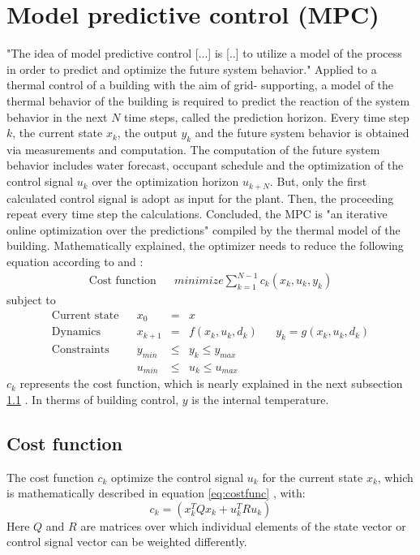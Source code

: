 \section{Model predictive control (MPC)}
\label{section:mpc}
"The idea of model predictive control [...] is [..] to utilize a model of the process in order to predict and optimize the future system behavior."
\cite{Grune.2017}
Applied to a thermal control of a building with the aim of grid- supporting, a model of the thermal behavior of the building is required to predict the reaction of the system behavior in the next $N$ time steps, called the prediction horizon. Every time step $k$, the current state \textbf{$x_k$}, the output \textbf{$y_k$} and the future system behavior is obtained via measurements and computation. The computation of the future system behavior includes water forecast, occupant schedule  and the optimization of the control signal \textbf{$u_k$} over the optimization horizon \textbf{$u_{k+N}$}. But, only the first calculated control signal is adopt as input for the plant.
Then, the proceeding repeat every time step the calculations. Concluded, the MPC is "an iterative online optimization over the predictions"
\cite{Grune.2017} 
compiled by the thermal model of the building. Mathematically explained, the optimizer needs to reduce the following equation according to
\cite{Kouvaritakis.2018}
and
\cite{Oldewurtel.2012}:
\begin{align}
\label{eq:costfunc}
\textrm{Cost function} && minimize \sum_{k=1}^{N-1} c_k(x_k,u_k,y_k)
\end{align}
subject to 
\begin{align*}
\textrm{Current state} && x_0 &=& x \\	
\textrm{Dynamics} && x_{k+1}&=& f(x_k,u_k,d_k)		&&	y_k = g(x_k,u_k,d_k)\\				
\textrm{Constraints} && y_{min}&\leq& y_k \leq y_{max}\\		
\textrm{} && u_{min}&\leq& u_k \leq u_{max}	
\end{align*}
$c_k$ represents the cost function, which is nearly explained in the next subsection  \ref{subsection:costfunction}
. In therms of building control, $y$ is the internal temperature.
\subsection{Cost function}
\label{subsection:costfunction}
The cost function $c_k$ optimize the control signal $u_k$ for the current state $x_k$, which is mathematically described in equation
\ref{eq:costfunc}
, with:
\begin{equation}
\label{eq:c_k}
c_k = (x_k^TQx_k+u_k^TRu_k)
\end{equation}
Here $Q$ and $R$ are matrices over which individual elements of the state vector or control signal vector can be weighted differently.  
\cite{Kouvaritakis.2016}

